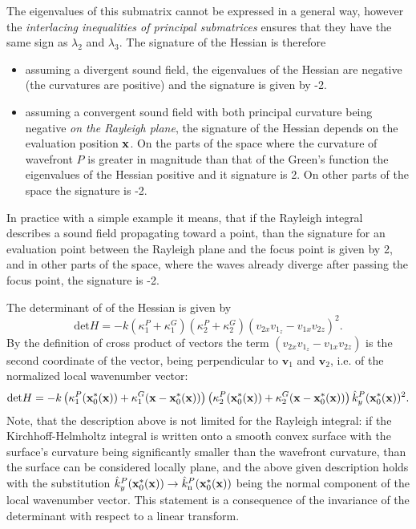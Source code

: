 The eigenvalues of this submatrix cannot be expressed in a general way, however the \emph{interlacing inequalities of principal submatrices}
ensures that they have the same sign as $\lambda_2$ and $\lambda_3$.
The signature of the Hessian is therefore 
\begin{itemize}
\item assuming a divergent sound field, the eigenvalues of the Hessian are negative (the curvatures are positive) and the signature is given by -2.
\item assuming a convergent sound field with both principal curvature being negative \emph{on the Rayleigh plane}, the signature of the Hessian depends on the evaluation position $\mathbf{x}$.
On the parts of the space where the curvature of wavefront $P$ is greater in magnitude than that of the Green's function the eigenvalues of the Hessian positive and it signature is 2.
On other parts of the space the signature is -2.
\end{itemize}
In practice with a simple example it means, that if the Rayleigh integral describes a sound field propagating toward a point, than the signature for an evaluation point between the Rayleigh plane and the focus point is given by 2, and in other parts of the space, where the waves already diverge after passing the focus point, the signature is -2.

The determinant of of the Hessian is given by
\begin{equation}
\mathrm{det} H  = -k \left( \kappa_1^P+\kappa_1^G \right) \left( \kappa_2^P+\kappa_2^G \right) \left( v_{2 x} v_{1_z} - v_{1 x} v_{2 z} \right)^2.
\end{equation}
By the definition of cross product of vectors the term $\left( v_{2 x} v_{1_z} - v_{1 x} v_{2 z} \right)$ is the second coordinate of the vector, being perpendicular to $\mathbf{v}_1$ and $\mathbf{v}_2$, i.e. of the normalized local wavenumber vector:
\begin{equation}
\mathrm{det} H  = -k \left( \kappa_1^P(\mathbf{x}_0^*(\mathbf{x}))+\kappa_1^G(\mathbf{x}-\mathbf{x}_0^*(\mathbf{x})) \right) \left( \kappa_2^P(\mathbf{x}_0^*(\mathbf{x}))+\kappa_2^G(\mathbf{x}-\mathbf{x}_0^*(\mathbf{x})) \right) \hat{k}_y^P(\mathbf{x}_0^*(\mathbf{x}))^2.
\end{equation}
Note, that the description above is not limited for the Rayleigh integral: if the Kirchhoff-Helmholtz integral is written onto a smooth convex surface with the surface's curvature being significantly smaller than the wavefront curvature, than the surface can be considered locally plane, and the above given description holds with the substitution $\hat{k}_y^P(\mathbf{x}_0^*(\mathbf{x})) \rightarrow \hat{k}_{\mathrm{n}}^P(\mathbf{x}_0^*(\mathbf{x}))$ being the normal component of the local wavenumber vector.
This statement is a consequence of the invariance of the determinant with respect to a linear transform.
	
